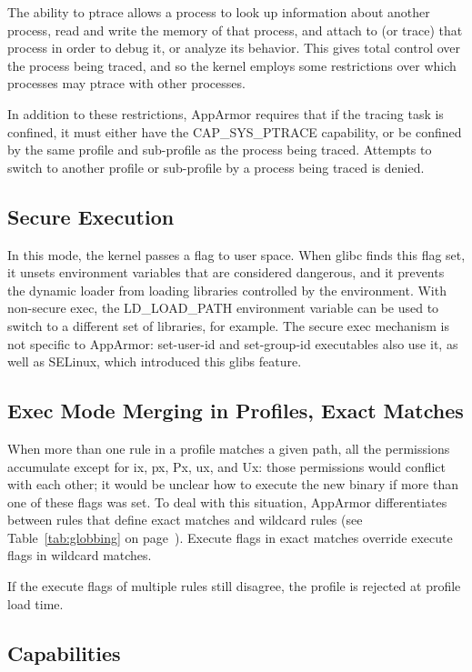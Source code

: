 \documentclass[a4paper]{article}
\renewcommand{\H}{\hspace{0pt}}
\begin{document}
The ability to ptrace allows a process to look up information about
another process, read and write the memory of that process, and attach
to (or trace) that process in order to debug it, or analyze its
behavior.  This gives total control over the process being traced, and
so the kernel employs some restrictions over which processes may ptrace
with other processes.

In addition to these restrictions, AppArmor requires that if the tracing
task is confined, it must either have the CAP\_{\H}SYS\_{\H}PTRACE capability,
or be confined by the same profile and sub-profile as the process being
traced.  Attempts to switch to another profile or sub-profile by a
process being traced is denied.


\subsection{Secure Execution}
\label{sec:secure-exec}

In this mode, the kernel passes a flag to user space.  When glibc finds
this flag set, it unsets environment variables that are considered
dangerous, and it prevents the dynamic loader from loading libraries
controlled by the environment.  With non-secure exec, the LD\_LOAD\_PATH
environment variable can be used to switch to a different set of
libraries, for example.  The secure exec mechanism is not specific to
AppArmor: set-user-id and set-group-id executables also use it, as well
as SELinux, which introduced this glibs feature.


\subsection{Exec Mode Merging in Profiles, Exact Matches}
\label{sec:merging}

When more than one rule in a profile matches a given path, all the
permissions accumulate except for ix, px, Px, ux, and Ux: those
permissions would conflict with each other; it would be unclear how to
execute the new binary if more than one of these flags was set.  To deal
with this situation, AppArmor differentiates between rules that define
exact matches and wildcard rules (see Table~\ref{tab:globbing} on
page~\pageref{tab:globbing}).  Execute flags in exact matches override
execute flags in wildcard matches.

If the execute flags of multiple rules still disagree, the profile is
rejected at profile load time.


\subsection{Capabilities}
\end{document}
